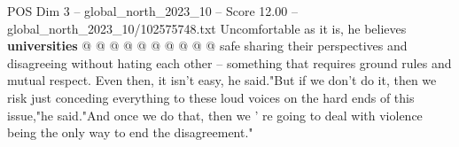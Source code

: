 \begin{textsample}{POS Dim 3 – global\_north\_2023\_10 – Score 12.00 – global\_north\_2023\_10/102575748.txt}
Uncomfortable as it is, he believes \textbf{universities} @ @ @ @ @ @ @ @ @ @ safe sharing their perspectives and disagreeing without hating each other -- something that requires ground rules and mutual respect.
Even then, it isn't easy, he said."But if we don't do it, then we risk just conceding everything to these loud voices on the hard ends of this issue,"he said."And once we do that, then we ' re going to deal with violence being the only way to end the disagreement."

\end{textsample}
